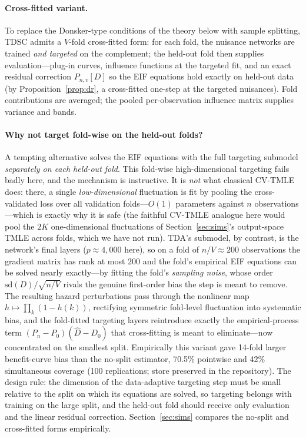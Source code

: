 \documentclass[11pt]{article}
\theoremstyle{remark}
\newcommand{\Pn}{P_n}
\begin{document}
\paragraph{Cross-fitted variant.} To replace the Donsker-type conditions of the theory below with sample splitting, TDSC admits a $V$-fold cross-fitted form: for each fold, the nuisance networks are trained \emph{and targeted} on the complement; the held-out fold then supplies evaluation---plug-in curves, influence functions at the targeted fit, and an exact residual correction $P_{n,v}[D]$ so the EIF equations hold exactly on held-out data (by Proposition~\ref{prop:dr}, a cross-fitted one-step at the targeted nuisances). Fold contributions are averaged; the pooled per-observation influence matrix supplies variance and bands.

\paragraph{Why not target fold-wise on the held-out folds?} A tempting alternative solves the EIF equations with the full targeting submodel \emph{separately on each held-out fold}. This fold-wise high-dimensional targeting fails badly here, and the mechanism is instructive. It is \emph{not} what classical CV-TMLE \citep{zheng2011cvtmle} does: there, a single \emph{low-dimensional} fluctuation is fit by pooling the cross-validated loss over all validation folds---$O(1)$ parameters against $n$ observations---which is exactly why it is safe (the faithful CV-TMLE analogue here would pool the $2K$ one-dimensional fluctuations of Section~\ref{sec:sims}'s output-space TMLE across folds, which we have not run). TDA's submodel, by contrast, is the network's final layers ($p \approx 4{,}000$ here), so on a fold of $n/V\approx200$ observations the gradient matrix has rank at most $200$ and the fold's empirical EIF equations can be solved nearly exactly---by fitting the fold's \emph{sampling noise}, whose order $\mathrm{sd}(D)/\sqrt{n/V}$ rivals the genuine first-order bias the step is meant to remove. The resulting hazard perturbations pass through the nonlinear map $h \mapsto \prod_k(1-h(k))$, rectifying symmetric fold-level fluctuation into systematic bias, and the fold-fitted targeting layers reintroduce exactly the empirical-process term $(\Pn - P_0)(\widehat D - D_0)$ that cross-fitting is meant to eliminate---now concentrated on the smallest split. Empirically this variant gave 14-fold larger benefit-curve bias than the no-split estimator, 70.5\% pointwise and 42\% simultaneous coverage (100 replications; store preserved in the repository). The design rule: the dimension of the data-adaptive targeting step must be small relative to the split on which its equations are solved, so targeting belongs with training on the large split, and the held-out fold should receive only evaluation and the linear residual correction. Section~\ref{sec:sims} compares the no-split and cross-fitted forms empirically.
\end{document}
